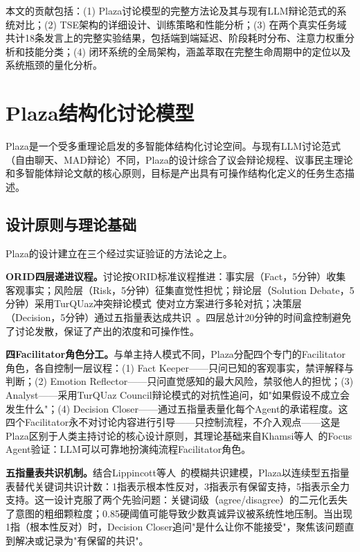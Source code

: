 \documentclass[conference]{IEEEtran}
\begin{document}
本文的贡献包括：(1) Plaza讨论模型的完整方法论及其与现有LLM辩论范式的系统对比；(2) TSE架构的详细设计、训练策略和性能分析；(3) 在两个真实任务域共计18条发言上的完整实验结果，包括端到端延迟、阶段耗时分布、注意力权重分析和技能分类；(4) 闭环系统的全局架构，涵盖萃取在完整生命周期中的定位以及系统瓶颈的量化分析。

\section{Plaza结构化讨论模型}

Plaza是一个受多重理论启发的多智能体结构化讨论空间。与现有LLM讨论范式（自由聊天、MAD辩论）不同，Plaza的设计综合了议会辩论规程、议事民主理论和多智能体辩论文献的核心原则，目标是产出具有可操作结构化定义的任务生态描述。

\subsection{设计原则与理论基础}

Plaza的设计建立在三个经过实证验证的方法论之上。

\textbf{ORID四层递进议程。}讨论按ORID标准议程推进：事实层（Fact，5分钟）收集客观事实；风险层（Risk，5分钟）征集直觉性担忧；辩论层（Solution Debate，5分钟）采用TurQUaz冲突辩论模式~\cite{gungor2025turquaz}使对立方案进行多轮对抗；决策层（Decision，5分钟）通过五指量表达成共识~\cite{kaner2014facilitator}。四层总计20分钟的时间盒控制避免了讨论发散，保证了产出的浓度和可操作性。

\textbf{四Facilitator角色分工。}与单主持人模式不同，Plaza分配四个专门的Facilitator角色，各自控制一层议程：(1) Fact Keeper——只问已知的客观事实，禁评解释与判断；(2) Emotion Reflector——只问直觉感知的最大风险，禁驳他人的担忧；(3) Analyst——采用TurQUaz Council辩论模式的对抗性追问，如"如果假设不成立会发生什么"；(4) Decision Closer——通过五指量表量化每个Agent的承诺程度。这四个Facilitator永不对讨论内容进行引导——只控制流程，不介入观点——这是Plaza区别于人类主持讨论的核心设计原则，其理论基础来自Khamsi等人~\cite{khamsi2024focus}的Focus Agent验证：LLM可以可靠地扮演纯流程Facilitator角色。

\textbf{五指量表共识机制。}结合Lippincott等人~\cite{lippincott2025fuzzy}的模糊共识建模，Plaza以连续型五指量表替代关键词共识计数：1指表示根本性反对，3指表示有保留支持，5指表示全力支持。这一设计克服了两个先验问题：关键词级（agree/disagree）的二元化丢失了意图的粗细颗粒度；0.85硬阈值可能导致少数真诚异议被系统性地压制。当出现1指（根本性反对）时，Decision Closer追问"是什么让你不能接受"，聚焦该问题直到解决或记录为"有保留的共识"。
\end{document}
